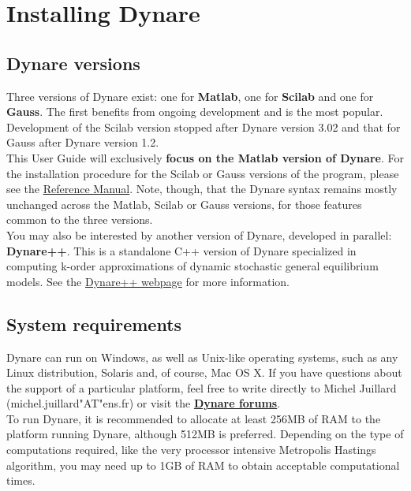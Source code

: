 \chapter{Installing Dynare} \label{ch:inst}

\section{Dynare versions}
Three versions of Dynare exist: one for \textbf{Matlab}, one for \textbf{Scilab} and one for \textbf{Gauss}. The first benefits from ongoing development and is the most popular. Development of the Scilab version stopped after Dynare version 3.02 and that for Gauss after Dynare version 1.2. \\

This User Guide will exclusively \textbf{focus on the Matlab version of Dynare}. For the installation procedure for the Scilab or Gauss versions of the program, please see the \href{http://www.cepremap.cnrs.fr/juillard/mambo/index.php?option=com_content&task=view&id=51&Itemid=84}{Reference Manual}. Note, though, that the Dynare syntax remains mostly unchanged across the Matlab, Scilab or Gauss versions, for those features common to the three versions. \\

You may also be interested by another version of Dynare, developed in parallel: \textbf{Dynare++}. This is a standalone C++ version of Dynare specialized in computing k-order approximations of dynamic stochastic general equilibrium models. See the \href{http://www.cepremap.cnrs.fr/juillard/mambo/index.php?option=com_content&task=view&id=53&Itemid=86}{Dynare++ webpage} for more information. 

\section{System requirements}
Dynare can run on Windows, as well as Unix-like operating systems, such as any Linux distribution, Solaris and, of course, Mac OS X. If you have questions about the support of a particular platform, feel free to write directly to Michel Juillard (michel.juillard"AT"ens.fr) or visit the \href{http://www.dynare.org/phpBB3}{\textbf{Dynare forums}}. \\

To run Dynare, it is recommended to allocate at least 256MB of RAM to the platform running Dynare, although 512MB is preferred. Depending on the type of computations required, like the very processor intensive Metropolis Hastings algorithm, you may need up to 1GB of RAM to obtain acceptable computational times. \\

